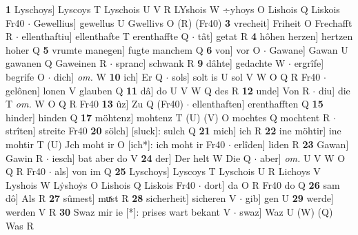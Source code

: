 \documentclass[8pt,a4paper,notitlepage]{article}
\begin{document}
\begin{table}[ht]
\begin{minipage}[t]{0.5\linewidth}
\textbf{1} Lyschoys] Lyscoys T Lyschois U V R LYshois W ÷yhoys O Lishois Q Liskois Fr40  $\cdot$ Gewellius] gewellus U Gwellivs O (R) (Fr40) \textbf{3} vrecheit] Friheit O Frechafft R  $\cdot$ ellenthaftiu] ellenthafte T erenthaffte Q  $\cdot$ tât] getat R \textbf{4} hôhen herzen] hertzen hoher Q \textbf{5} vrumte manegen] fugte manchem Q \textbf{6} von] vor O  $\cdot$ Gawane] Gawan U gawanen Q Gaweinen R  $\cdot$ spranc] schwank R \textbf{9} dâhte] gedachte W  $\cdot$ ergrîfe] begrife O  $\cdot$ dich] \textit{om.} W \textbf{10} ich] Er Q  $\cdot$ sols] solt is U sol V W O Q R Fr40  $\cdot$ gelônen] lonen V glauben Q \textbf{11} dâ] do U V W Q des R \textbf{12} unde] Von R  $\cdot$ diu] die T \textit{om.} W O Q R Fr40 \textbf{13} ûz] Zu Q (Fr40)  $\cdot$ ellenthaften] erenthafften Q \textbf{15} hinder] hinden Q \textbf{17} möhtenz] mohtenz T (U) (V) O mochtes Q mochtent R  $\cdot$ strîten] streite Fr40 \textbf{20} sölch] [sluck]: sulch Q \textbf{21} mich] ich R \textbf{22} ine möhtir] ine mohtir T (U) Jch moht ir O [ich*]: ich moht ir Fr40  $\cdot$ erlîden] liden R \textbf{23} Gawan] Gawin R  $\cdot$ iesch] bat aber do V \textbf{24} der] Der helt W Die Q  $\cdot$ aber] \textit{om.} U V W O Q R Fr40  $\cdot$ als] von im Q \textbf{25} Lyschoys] Lyscoys T Lyschois U R Lichoys V Lyshois W Lẏshoẏs O Lishois Q Liskois Fr40  $\cdot$ dort] da O R Fr40 do Q \textbf{26} sam dô] Als R \textbf{27} sûmest] muͯst R \textbf{28} sicherheit] sicheren V  $\cdot$ gib] gen U \textbf{29} werde] werden V R \textbf{30} Swaz mir ie [*]: prises wart bekant V  $\cdot$ swaz] Waz U (W) (Q) Was R \newline
\end{minipage}
\end{table}
\end{document}
